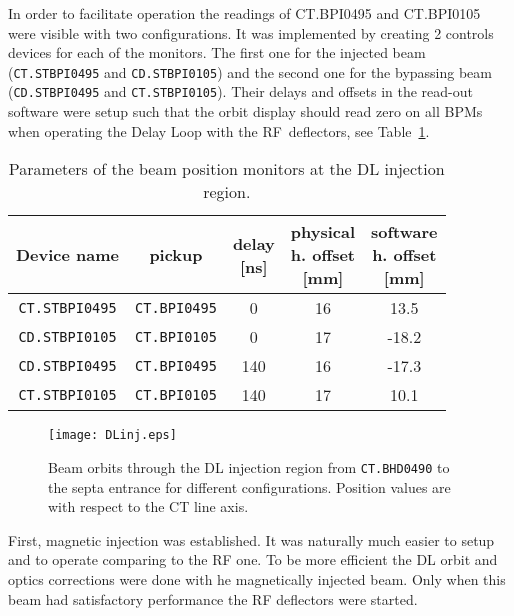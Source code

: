 In order to facilitate operation the readings of 
CT.BPI0495 and CT.BPI0105 were visible with two configurations.
It was implemented by creating 2 controls devices for each of the monitors. 
The first one for the injected beam (\texttt{CT.STBPI0495} and \texttt{CD.STBPI0105}) and 
the second one for the bypassing beam (\texttt{CD.STBPI0495} and \texttt{CT.STBPI0105}).
Their delays and offsets in the read-out software were setup such that
the orbit display should read zero on all BPMs when operating the Delay Loop with the RF~deflectors, 
see Table~\ref{tab:DLinjBPMpars}.


\begin{table}
\centering
\begin{tabular}{@{}*{5}{c}@{}}
  Device name & pickup & \thead[c]{delay \\ {[ns]}} & \thead{physical \\ h. offset \\ {[mm]}} & \thead{software \\ h. offset \\ {[mm]}} \\
  \hline
  \texttt{CT.STBPI0495} & \texttt{CT.BPI0495} & 0   & 16 &  13.5 \\
  \texttt{CD.STBPI0105} & \texttt{CT.BPI0105} & 0   & 17 & -18.2 \\
  \texttt{CD.STBPI0495} & \texttt{CT.BPI0495} & 140 & 16 & -17.3 \\
  \texttt{CT.STBPI0105} & \texttt{CT.BPI0105} & 140 & 17 &  10.1 \\
\end{tabular}
\caption{Parameters of the beam position monitors at the \ac{DL} injection region.}
\label{tab:DLinjBPMpars}
\end{table}


\begin{figure}
\begin{center}
  \texttt{[image: DLinj.eps]}
  \caption{Beam orbits through the \ac{DL} injection region from \texttt{CT.BHD0490} 
           to the septa entrance for different configurations. 
           Position values are with respect to the CT line axis.}
\label{fig:DLinj}
\end{center}
\end{figure}

First, magnetic injection was established. 
It was naturally much easier to setup and to operate comparing to the RF one. 
To be more efficient the \ac{DL} orbit and optics corrections were done with 
he magnetically injected beam.
Only when this beam had satisfactory performance the RF deflectors were started.


